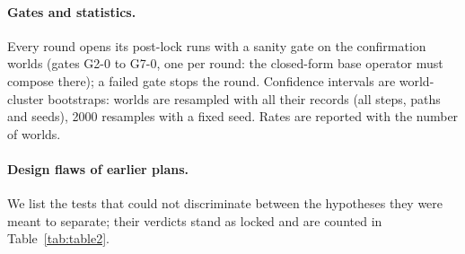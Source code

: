 \paragraph{Gates and statistics.}
Every round opens its post-lock runs with a sanity gate on the confirmation worlds (gates G2-0 to G7-0, one per round: the closed-form base operator must compose
there); a failed gate stops the round. Confidence intervals are world-cluster bootstraps: worlds are resampled with all their records
(all steps, paths and seeds), 2000 resamples with a fixed seed. Rates are reported with the number of worlds.

\paragraph{Design flaws of earlier plans.}
We list the tests that could not discriminate between the hypotheses they were meant to separate; their verdicts stand as locked and
are counted in Table~\ref{tab:table2}.
